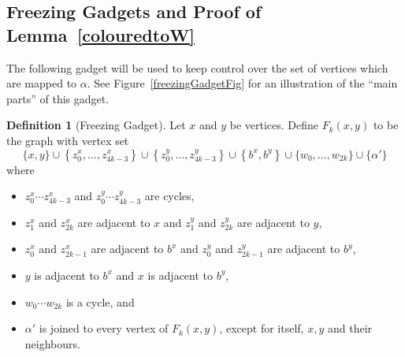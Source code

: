 \documentclass[11 pt]{amsart}
\theoremstyle{definition}
\newtheorem{defn}[equation]{Definition}
\theoremstyle{case}
\numberwithin{equation}{section}
\begin{document}


\subsection{Freezing Gadgets and Proof of Lemma~\ref{colouredtoW}}

The following gadget will be used to keep control over the set of vertices which are mapped to $\alpha$. See Figure~\ref{freezingGadgetFig} for an illustration of the ``main parts'' of this gadget. 

\begin{defn}[Freezing Gadget]
Let $x$ and $y$ be vertices. Define $F_{k}(x,y)$ to be the graph with vertex set
\[\{x,y\}\cup\left\{z_0^x,\dots,z_{4k-3}^x\right\}\cup\left\{z_0^y,\dots,z_{4k-3}^y\right\}\cup\left\{b^x,b^y\right\}\cup \{w_0,\dots,w_{2k}\}\cup\{\alpha'\}\] 
where 
\begin{itemize}
\item $z_0^x\cdots z_{4k-3}^x$ and $z_0^y\cdots z_{4k-3}^y$ are cycles, 
\item $z_1^x$ and $z_{2k}^x$ are adjacent to $x$ and $z_1^y$ and $z_{2k}^y$ are adjacent to $y$, 
\item $z_0^x$ and $z_{2k-1}^x$ are adjacent to $b^x$ and $z_0^y$ and $z_{2k-1}^y$ are adjacent to $b^y$,
\item $y$ is adjacent to $b^x$ and $x$ is adjacent to $b^y$,
\item $w_0\cdots w_{2k}$ is a cycle, and
\item $\alpha'$ is joined to every vertex of $F_k(x,y)$, except for itself, $x,y$ and their neighbours.
\end{itemize}
\end{defn}
\end{document}
